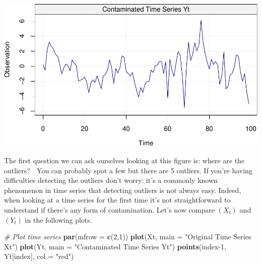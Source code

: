 \documentclass[]{book}
\newenvironment{Shaded}{\begin{snugshade}}{\end{snugshade}}
\newcommand{\CommentTok}[1]{\textcolor[rgb]{0.56,0.35,0.01}{\textit{#1}}}
\newcommand{\DataTypeTok}[1]{\textcolor[rgb]{0.13,0.29,0.53}{#1}}
\newcommand{\DecValTok}[1]{\textcolor[rgb]{0.00,0.00,0.81}{#1}}
\newcommand{\KeywordTok}[1]{\textcolor[rgb]{0.13,0.29,0.53}{\textbf{#1}}}
\newcommand{\NormalTok}[1]{#1}
\newcommand{\StringTok}[1]{\textcolor[rgb]{0.31,0.60,0.02}{#1}}
\theoremstyle{definition}
\theoremstyle{definition}
\theoremstyle{definition}
\theoremstyle{remark}
\begin{document}
\includegraphics{ts_files/figure-latex/Yt-1.pdf}

The first question we can ask ourselves looking at this figure is: where
are the outliers? 🤔 You can probably spot a few but there are 5
outliers. If you're having difficulties detecting the outliers don't
worry: it's a commonly known phenomenon in time series that detecting
outliers is not always easy. Indeed, when looking at a time series for
the first time it's not straightforward to understand if there's any
form of contamination. Let's now compare \((X_t)\) and \((Y_t)\) in the
following plots.

\begin{Shaded}
\begin{Highlighting}[]
\CommentTok{# Plot time series}
\KeywordTok{par}\NormalTok{(}\DataTypeTok{mfrow =} \KeywordTok{c}\NormalTok{(}\DecValTok{2}\NormalTok{,}\DecValTok{1}\NormalTok{))}
\KeywordTok{plot}\NormalTok{(Xt, }\DataTypeTok{main =} \StringTok{"Original Time Series Xt"}\NormalTok{)}
\KeywordTok{plot}\NormalTok{(Yt, }\DataTypeTok{main =} \StringTok{"Contaminated Time Series Yt"}\NormalTok{)}
\KeywordTok{points}\NormalTok{(index}\DecValTok{-1}\NormalTok{, Yt[index], }\DataTypeTok{col =} \StringTok{"red"}\NormalTok{)}
\end{Highlighting}
\end{Shaded}
\end{document}
